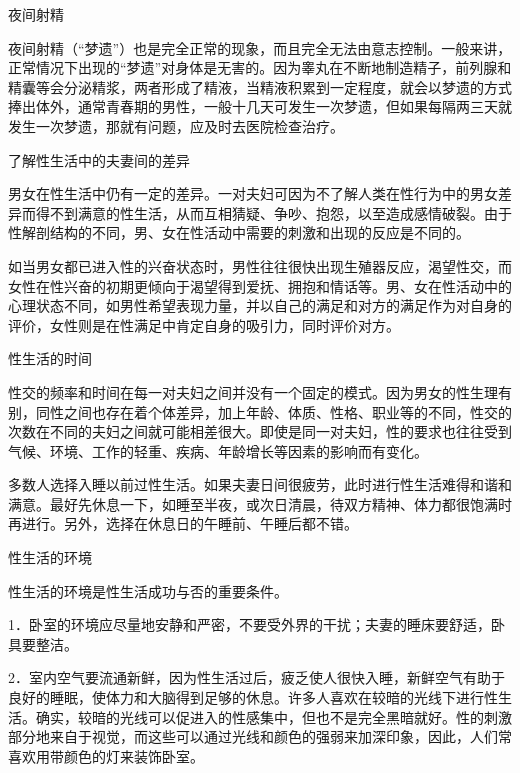 \documentclass[12pt,UTF8]{ctexbook}
\begin{document}
夜间射精


夜间射精（“梦遗”）也是完全正常的现象，而且完全无法由意志控制。一般来讲，正常情况下出现的“梦遗”对身体是无害的。因为睾丸在不断地制造精子，前列腺和精囊等会分泌精浆，两者形成了精液，当精液积累到一定程度，就会以梦遗的方式捧出体外，通常青春期的男性，一般十几天可发生一次梦遗，但如果每隔两三天就发生一次梦遗，那就有问题，应及时去医院检查治疗。





了解性生活中的夫妻间的差异


男女在性生活中仍有一定的差异。一对夫妇可因为不了解人类在性行为中的男女差异而得不到满意的性生活，从而互相猜疑、争吵、抱怨，以至造成感情破裂。由于性解剖结构的不同，男、女在性活动中需要的刺激和出现的反应是不同的。

如当男女都已进入性的兴奋状态时，男性往往很快出现生殖器反应，渴望性交，而女性在性兴奋的初期更倾向于渴望得到爱抚、拥抱和情话等。男、女在性活动中的心理状态不同，如男性希望表现力量，并以自己的满足和对方的满足作为对自身的评价，女性则是在性满足中肯定自身的吸引力，同时评价对方。





性生活的时间


性交的频率和时间在每一对夫妇之间并没有一个固定的模式。因为男女的性生理有别，同性之间也存在着个体差异，加上年龄、体质、性格、职业等的不同，性交的次数在不同的夫妇之间就可能相差很大。即使是同一对夫妇，性的要求也往往受到气候、环境、工作的轻重、疾病、年龄增长等因素的影响而有变化。

多数人选择入睡以前过性生活。如果夫妻日间很疲劳，此时进行性生活难得和谐和满意。最好先休息一下，如睡至半夜，或次日清晨，待双方精神、体力都很饱满时再进行。另外，选择在休息日的午睡前、午睡后都不错。





性生活的环境


性生活的环境是性生活成功与否的重要条件。

1．卧室的环境应尽量地安静和严密，不要受外界的干扰；夫妻的睡床要舒适，卧具要整洁。

2．室内空气要流通新鲜，因为性生活过后，疲乏使人很快入睡，新鲜空气有助于良好的睡眠，使体力和大脑得到足够的休息。许多人喜欢在较暗的光线下进行性生活。确实，较暗的光线可以促进入的性感集中，但也不是完全黑暗就好。性的刺激部分地来自于视觉，而这些可以通过光线和颜色的强弱来加深印象，因此，人们常喜欢用带颜色的灯来装饰卧室。
\end{document}
